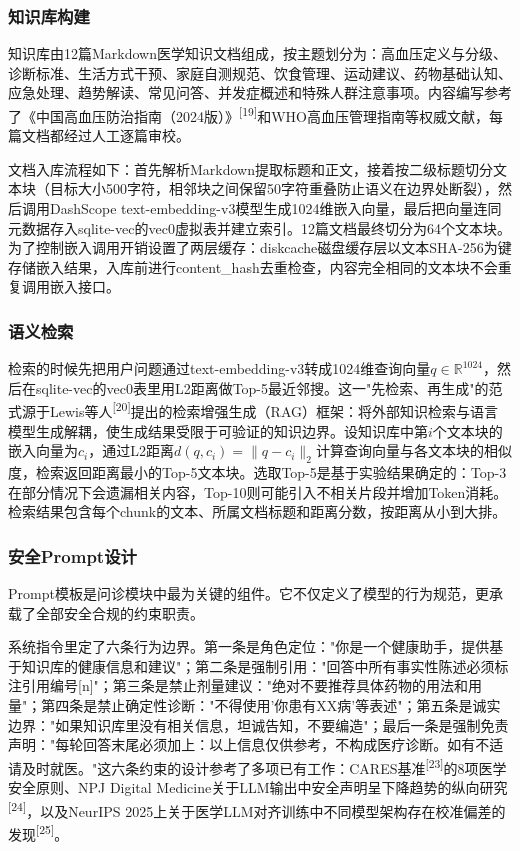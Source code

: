 \documentclass[zihao=-4,a4paper]{ctexart}
\numberwithin{figure}{section}
\numberwithin{table}{section}
\begin{document}
\subsubsection{知识库构建}

知识库由12篇Markdown医学知识文档组成，按主题划分为：高血压定义与分级、诊断标准、生活方式干预、家庭自测规范、饮食管理、运动建议、药物基础认知、应急处理、趋势解读、常见问答、并发症概述和特殊人群注意事项。内容编写参考了《中国高血压防治指南（2024版）》\textsuperscript{[19]}和WHO高血压管理指南等权威文献，每篇文档都经过人工逐篇审校。

文档入库流程如下：首先解析Markdown提取标题和正文，接着按二级标题切分文本块（目标大小500字符，相邻块之间保留50字符重叠防止语义在边界处断裂），然后调用DashScope text-embedding-v3模型生成1024维嵌入向量，最后把向量连同元数据存入sqlite-vec的vec0虚拟表并建立索引。12篇文档最终切分为64个文本块。为了控制嵌入调用开销设置了两层缓存：diskcache磁盘缓存层以文本SHA-256为键存储嵌入结果，入库前进行content\_hash去重检查，内容完全相同的文本块不会重复调用嵌入接口。

\subsubsection{语义检索}

检索的时候先把用户问题通过text-embedding-v3转成1024维查询向量$q \in \mathbb{R}^{1024}$，然后在sqlite-vec的vec0表里用L2距离做Top-5最近邻搜。这一"先检索、再生成"的范式源于Lewis等人\textsuperscript{[20]}提出的检索增强生成（RAG）框架：将外部知识检索与语言模型生成解耦，使生成结果受限于可验证的知识边界。设知识库中第$i$个文本块的嵌入向量为$c_i$，通过L2距离$d(q, c_i) = \|q - c_i\|_2$计算查询向量与各文本块的相似度，检索返回距离最小的Top-5文本块。选取Top-5是基于实验结果确定的：Top-3在部分情况下会遗漏相关内容，Top-10则可能引入不相关片段并增加Token消耗。检索结果包含每个chunk的文本、所属文档标题和距离分数，按距离从小到大排。

\subsubsection{安全Prompt设计}

Prompt模板是问诊模块中最为关键的组件。它不仅定义了模型的行为规范，更承载了全部安全合规的约束职责。

系统指令里定了六条行为边界。第一条是角色定位："你是一个健康助手，提供基于知识库的健康信息和建议"；第二条是强制引用："回答中所有事实性陈述必须标注引用编号[n]"；第三条是禁止剂量建议："绝对不要推荐具体药物的用法和用量"；第四条是禁止确定性诊断："不得使用'你患有XX病'等表述"；第五条是诚实边界："如果知识库里没有相关信息，坦诚告知，不要编造"；最后一条是强制免责声明："每轮回答末尾必须加上：以上信息仅供参考，不构成医疗诊断。如有不适请及时就医。"这六条约束的设计参考了多项已有工作：CARES基准\textsuperscript{[23]}的8项医学安全原则、NPJ Digital Medicine关于LLM输出中安全声明呈下降趋势的纵向研究\textsuperscript{[24]}，以及NeurIPS 2025上关于医学LLM对齐训练中不同模型架构存在校准偏差的发现\textsuperscript{[25]}。
\end{document}
